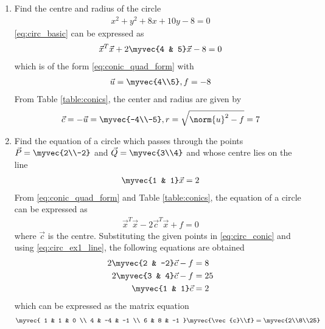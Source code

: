 \renewcommand{\theequation}{\theenumi}
\begin{enumerate}[label=\thesection.\arabic*.,ref=\thesection.\theenumi]
\item  Find the centre and radius of the circle 
\begin{align}
x^2+y^2+8x+10y-8 = 0
\label{eq:circ_basic}
\end{align}
\solution
\eqref{eq:circ_basic} can be expressed as 
\begin{align}
\vec{x}^T\vec{x}+ 2\myvec{4 & 5}\vec{x} -8 = 0
\end{align}
which is of the form \eqref{eq:conic_quad_form} with
\begin{align}
\label{eq:circ_basic_uf}
\vec{u} = \myvec{4\\5}, f = -8
\end{align}
From  Table \ref{table:conics}, the center and radius are given by 
\begin{align}
\vec{c} = -\vec{u} = \myvec{-4\\-5},
r = \sqrt{\norm{u}^2-f} = 7
\end{align}
\item Find the equation of a circle which passes through the points $\vec{P} = \myvec{2\\-2}$ and $\vec{Q} = \myvec{3\\4}$ and whose centre lies on the line  
\begin{align}
\label{eq:circ_ex1_line}
\myvec{1 & 1} \vec{x} = 2
\end{align}
\solution From \eqref{eq:conic_quad_form} and Table \ref{table:conics}, the equation of a circle can be expressed as
\begin{align}
\label{eq:circ_conic}
\vec{x}^T\vec{x}-2\vec{c}^T\vec{x}+f = 0
\end{align}
where $\vec{c}$ is the centre.
Substituting the given points in 
\eqref{eq:circ_conic} and using 
\eqref{eq:circ_ex1_line}, the following equations are obtained
\begin{align}
2\myvec{2 & -2}\vec{c} -  f &= 8
\\
2\myvec{3 & 4}\vec{c} -  f &= 25
\\
\myvec{1 & 1}\vec{c}  &= 2
\end{align}
which can be expressed as the matrix equation
\begin{align}
\myvec{
1 & 1 & 0
\\
4 & -4 & -1 
\\ 
6 & 8 & -1  
}
\myvec{\vec{c}\\f} = \myvec{2\\8\\25}

\end{align}
\end{enumerate}
